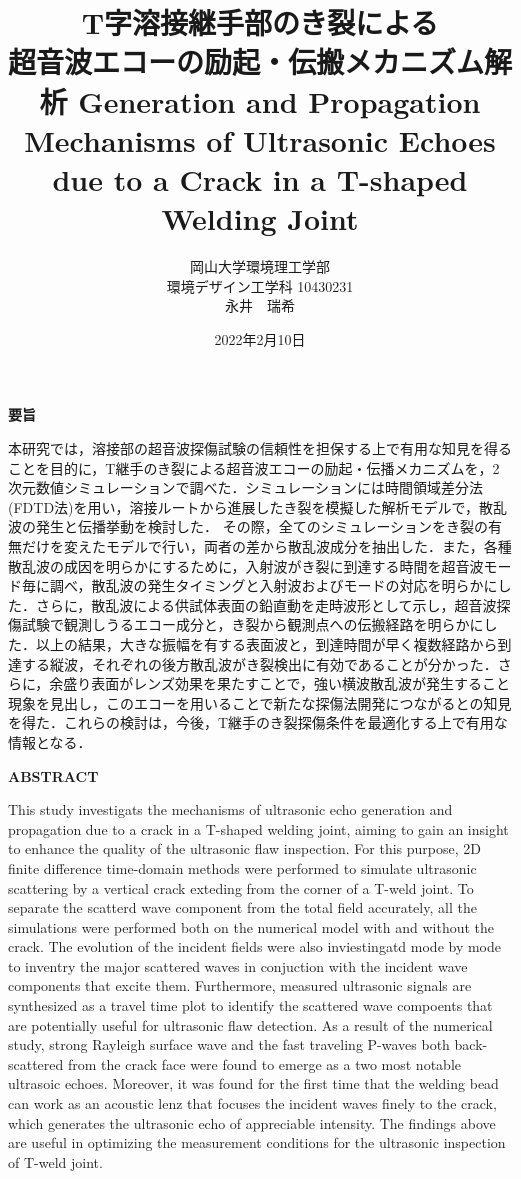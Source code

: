 ﻿\documentclass[11pt,a4j]{mybook2}
\title{
\vspace{20mm}
T字溶接継手部のき裂による\\
超音波エコーの励起・伝搬メカニズム解析
\vspace{5mm}
Generation and Propagation Mechanisms of Ultrasonic Echoes \\
due to a Crack in a T-shaped Welding Joint
\vspace{60mm}
}
\date{2022年2月10日}
\author{
	\vspace{40mm}
岡山大学環境理工学部\\
環境デザイン工学科 10430231\\
	永井　瑞希
}
\begin{document}
\maketitle
\begin{center}
\begin{minipage}{15cm}
\begin{center}
	{\bf 要旨}
\end{center}
本研究では，溶接部の超音波探傷試験の信頼性を担保する上で有用な知見を得ることを目的に，T継手のき裂による超音波エコーの励起・伝播メカニズムを，2次元数値シミュレーションで調べた．シミュレーションには時間領域差分法(FDTD法)を用い，溶接ルートから進展したき裂を模擬した解析モデルで，散乱波の発生と伝播挙動を検討した．
その際，全てのシミュレーションをき裂の有無だけを変えたモデルで行い，両者の差から散乱波成分を抽出した．また，各種散乱波の成因を明らかにするために，入射波がき裂に到達する時間を超音波モード毎に調べ，散乱波の発生タイミングと入射波およびモードの対応を明らかにした．さらに，散乱波による供試体表面の鉛直動を走時波形として示し，超音波探傷試験で観測しうるエコー成分と，き裂から観測点への伝搬経路を明らかにした．以上の結果，大きな振幅を有する表面波と，到達時間が早く複数経路から到達する縦波，それぞれの後方散乱波がき裂検出に有効であることが分かった．さらに，余盛り表面がレンズ効果を果たすことで，強い横波散乱波が発生すること現象を見出し，このエコーを用いることで新たな探傷法開発につながるとの知見を得た．これらの検討は，今後，T継手のき裂探傷条件を最適化する上で有用な情報となる．
	\vspace{15mm}
\begin{center}
	{\bf ABSTRACT}
\end{center}
This study investigats the mechanisms of ultrasonic echo generation and propagation due to 
a crack in a T-shaped welding joint, aiming to gain an insight to enhance the quality of the 
ultrasonic flaw inspection.
For this purpose, 2D finite difference time-domain methods were performed to simulate ultrasonic 
scattering by a vertical crack exteding from the corner of a T-weld joint. 
To separate the scatterd wave component from the total field accurately, all the simulations were 
performed both on the numerical model with and without the crack. The evolution of the incident 
fields were also inviestingatd mode by mode to inventry the major scattered waves in conjuction 
with the incident wave components that excite them. Furthermore, measured ultrasonic signals are 
synthesized as a travel time plot to identify the scattered wave compoents that are potentially 
useful for ultrasonic flaw detection. As a result of the numerical study, strong Rayleigh surface 
wave and the fast traveling P-waves both back-scattered from the crack face were found to 
 emerge as a two most notable ultrasoic echoes. Moreover, it was found for the first time that 
the welding bead can work as an acoustic lenz that focuses the incident waves finely to the crack, 
which  generates the ultrasonic echo of appreciable intensity.
The findings above are useful in optimizing the measurement conditions for the ultrasonic 
inspection of T-weld joint.
\end{minipage}
\end{center}
\tableofcontents
\frontmatter
\mainmatter
\end{document}
